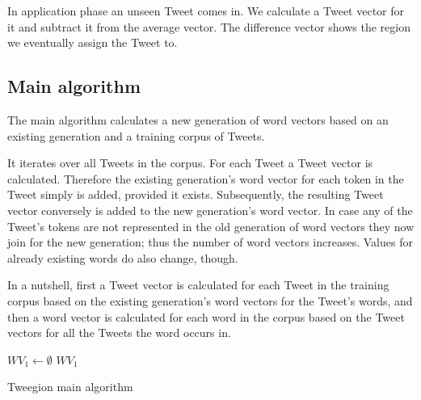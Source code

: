 \documentclass[../Main.tex]{subfiles}
\begin{document}
In application phase an unseen Tweet comes in. We calculate a Tweet vector for it and subtract it from the average vector. The difference vector shows the region we eventually assign the Tweet to.

\subsection{Main algorithm}
The main algorithm calculates a new generation of word vectors based on an existing generation and a training corpus of Tweets.

It iterates over all Tweets in the corpus. For each Tweet a Tweet vector is calculated. Therefore the existing generation's word vector for each token in the Tweet simply is added, provided it exists. Subsequently, the resulting Tweet vector conversely is added to the new generation's word vector. In case any of the Tweet's tokens are not represented in the old generation of word vectors they now join for the new generation; thus the number of word vectors increases. Values for already existing words do also change, though.

In a nutshell, first a Tweet vector is calculated for each Tweet in the training corpus based on the existing generation's word vectors for the Tweet's words, and then a word vector is calculated for each word in the corpus based on the Tweet vectors for all the Tweets the word occurs in.\\

\begin{algorithm}[H]
 \SetAlgoLined\DontPrintSemicolon
 $WV_1 \gets\emptyset $\;
 \Return $WV_1$\;
 \caption{Tweegion main algorithm}
\end{algorithm}
\end{document}
